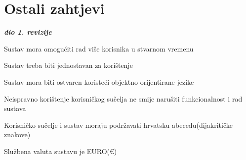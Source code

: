 		\section{Ostali zahtjevi}
		
			\textbf{\textit{dio 1. revizije}}\\
		 
			 \begin{packed_item}
			 	\item Sustav mora omogućiti rad više korisnika u stvarnom vremenu
			 	\item Sustav treba biti jednostavan za korištenje
			 	\item Sustav mora biti ostvaren koristeći objektno orijentirane jezike
			 	\item Neispravno korištenje korisničkog sučelja ne smije narušiti funkcionalnost i rad sustava
			 	\item Korisničko sučelje i sustav moraju podržavati hrvatsku abecedu(dijakritičke znakove)
			 	\item Službena valuta sustavu je EURO(€)
			 \end{packed_item}
			 
			 
			 
	